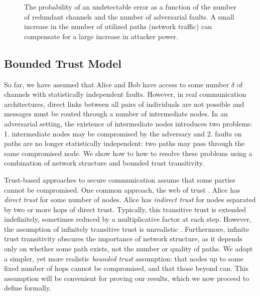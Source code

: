 \documentclass[10pt,letterpaper]{article}
\providecommand{\DIFdelbegin}{} %
\providecommand{\DIFaddbeginFL}{} %
\providecommand{\DIFaddendFL}{} %
\providecommand{\DIFdelendFL}{} %
\begin{document}
\DIFdelbegin %
\DIFdelendFL \DIFaddbeginFL \begin{figure}[H]
\DIFaddendFL %
\caption{
The probability of an undetectable error as a function of the number of
redundant channels and the number of adversarial faults.
A small increase in the number of utilized paths (network traffic)
can compensate for a large increase in attacker power.
}
\label{fig:pfail}
\end{figure}

\subsection*{Bounded Trust Model}

So far, we have assumed that Alice and Bob have access to some number
$\delta$ of channels with statistically independent faults.
However, in real communication architectures, direct links between all
pairs of individuals are not possible and messages must be routed through
a number of intermediate nodes.
In an adversarial setting,
the existence of intermediate nodes introduces two problems:
1. intermediate nodes may be compromised by the adversary and
2. faults on paths are no longer statistically independent:
two paths may pass through the same compromised node.
We show how to how to resolve these problems using a combination of network
structure and bounded trust transitivity.

Trust-based approaches to secure communication assume that some parties
cannot be compromised.
One common approach, the web of trust
\cite{zimmermann_official_1995,richters_trust_2011}.
Alice has {\em direct trust} for some number of nodes.
Alice has {\em indirect trust} for nodes separated by two or more hops of
direct trust.
Typically, this transitive trust is extended indefinitely,
sometimes reduced by a multiplicative factor at each step.
However, the assumption of infinitely transitive trust is unrealistic
\cite{christianson_why_1997}.
Furthermore, infinite trust transitivity obscures the importance of network structure,
as it depends only on whether some path exists, not the number or quality of paths.
We adopt a simpler, yet more realistic {\em bounded trust} assumption:
that nodes up to some fixed number of hops cannot be compromised,
and that those beyond can.
This assumption will be convenient for proving our results,
which we now proceed to define formally.
\end{document}
